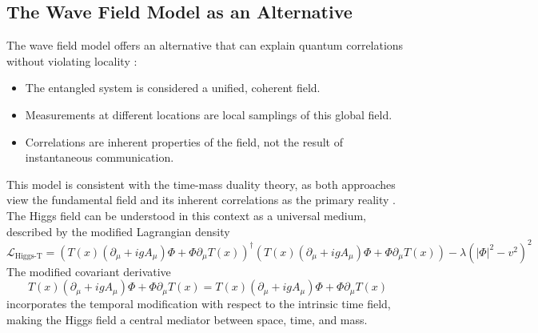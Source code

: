 \documentclass[12pt,a4paper]{article}
\newcommand{\DhiggsT}{T(x) (\partial_\mu + igA_\mu)\Phi + \Phi \partial_\mu T(x)}
\begin{document}
	\subsection{The Wave Field Model as an Alternative}
	The wave field model offers an alternative that can explain quantum correlations without violating locality \cite{Bohm1980}\relax:
	\begin{itemize}
		\item The entangled system is considered a unified, coherent field.
		\item Measurements at different locations are local samplings of this global field.
		\item Correlations are inherent properties of the field, not the result of instantaneous communication.
	\end{itemize}
	This model is consistent with the time-mass duality theory, as both approaches view the fundamental field and its inherent correlations as the primary reality \cite{Pascher2024}\relax. The Higgs field can be understood in this context as a universal medium, described by the modified Lagrangian density
	\begin{equation}
		\mathcal{L}_{\text{Higgs-T}} = (\DhiggsT)^\dagger (\DhiggsT) - \lambda(|\Phi|^2 - v^2)^2
	\end{equation}
	The modified covariant derivative
	\begin{equation}
		\DhiggsT = T(x) (\partial_\mu + igA_\mu)\Phi + \Phi \partial_\mu T(x)
	\end{equation}
	incorporates the temporal modification with respect to the intrinsic time field, making the Higgs field a central mediator between space, time, and mass.
	
\end{document}
